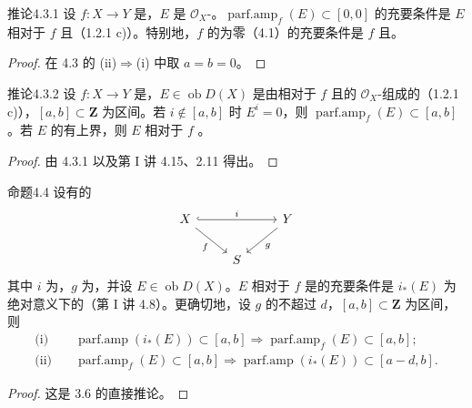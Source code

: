 \begin{SGAresult}{推论}{4.3.1}
设 $f:X\to Y$ 是，$E$ 是 $\mathcal O_X$-。$\operatorname{parf.amp}_f(E)\subset[0,0]$ 的充要条件是 $E$ 相对于 $f$ 且（1.2.1 c)）。特别地，$f$ 的为零（4.1）的充要条件是 $f$ 且。
\end{SGAresult}
\begin{proof}在 4.3 的 (ii)$\Rightarrow$(i) 中取 $a=b=0$。
\end{proof}
\begin{SGAresult}{推论}{4.3.2}
设 $f:X\to Y$ 是，$E\in\operatorname{ob}D(X)$ 是由相对于 $f$ 且的 $\mathcal O_X$-组成的（1.2.1 c)），$[a,b]\subset\mathbf Z$ 为区间。若 $i\notin[a,b]$ 时 $E^i=0$，则 $\operatorname{parf.amp}_f(E)\subset[a,b]$。若 $E$ 的有上界，则 $E$ 相对于 $f$ 。
\end{SGAresult}
\begin{proof}由 4.3.1 以及第 I 讲 4.15、2.11 得出。
\end{proof}
\begin{SGAresult}{命题}{4.4}
设有的
\[
\begin{tikzcd}
X\arrow[rr,hook,"i"]\arrow[dr,"f"']&&Y\arrow[dl,"g"]\\
&S&
\end{tikzcd}
\]
其中 $i$ 为，$g$ 为，并设 $E\in\operatorname{ob}D(X)$。$E$ 相对于 $f$ 是的充要条件是 $i_*(E)$ 为绝对意义下的（第 I 讲 4.8）。更确切地，设 $g$ 的不超过 $d$，$[a,b]\subset\mathbf Z$ 为区间，则
\begin{align*}
\text{(i)}\quad&\operatorname{parf.amp}(i_*(E))\subset[a,b]\Longrightarrow\operatorname{parf.amp}_f(E)\subset[a,b];\\
\text{(ii)}\quad&\operatorname{parf.amp}_f(E)\subset[a,b]\Longrightarrow\operatorname{parf.amp}(i_*(E))\subset[a-d,b].
\end{align*}
\end{SGAresult}
\begin{proof}这是 3.6 的直接推论。
\end{proof}
